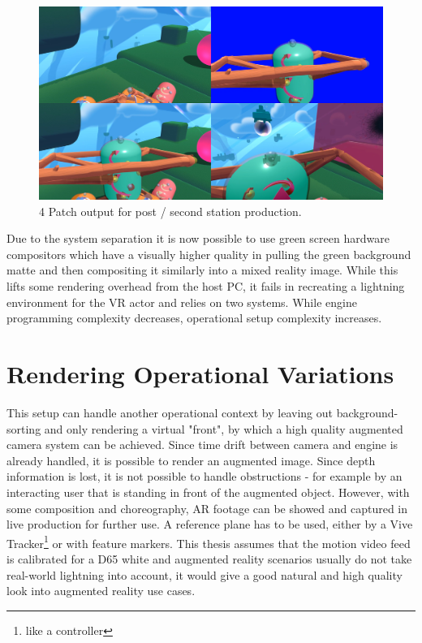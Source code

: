 \begin{figure}[htb]
	\includegraphics[width=\textwidth]{_external/media/4patch.jpg}
	\caption{4 Patch output for post / second station 
		production\cite{gartner:mixed-reality:2017}.}
	\label{fig:alt-render:4patch}
\end{figure}

Due to the system separation it is now possible to use green screen hardware 
compositors which have a visually higher quality in pulling the green 
background matte and then compositing it similarly into a mixed reality image. 
While this lifts some rendering overhead from the host PC, it fails in 
recreating a lightning environment for the VR actor and relies on two systems. 
While engine programming complexity decreases, operational setup complexity 
increases.

\section{Rendering Operational Variations}

This setup can handle another operational context by leaving out 
background-sorting and only rendering a virtual "front", by which a high 
quality augmented camera system can be achieved. Since time drift between 
camera and engine is already handled, it is possible to render an augmented 
image. Since depth information is lost, it is not possible to handle 
obstructions - for example by an interacting user that is standing in front of 
the augmented object. However, with some composition and choreography, AR 
footage can be showed and captured in live production for further use. A 
reference plane has to be used, either by a Vive Tracker\footnote{like a 
controller} or with feature markers.
\newline
This thesis assumes that the motion video feed is calibrated for a D65 white 
and augmented reality scenarios usually do not take real-world lightning into 
account, it would give a good natural and high quality look into augmented 
reality use cases.

